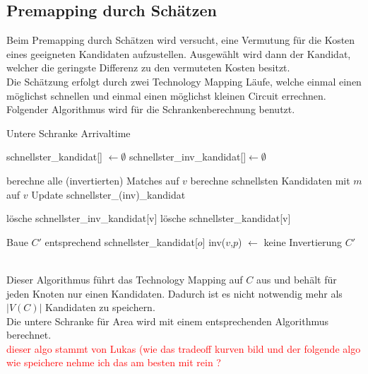 \documentclass[11pt, a4paper, german]{article}
\newcommand{\TM}{Technology  Mapping }
\begin{document}
\subsection{Premapping durch Schätzen}
\label{subsec:premapping_duch_schaetzen}
 Beim Premapping durch Schätzen wird versucht, eine Vermutung für die Kosten eines geeigneten Kandidaten aufzustellen. Ausgewählt wird dann der Kandidat, welcher die geringste Differenz zu den vermuteten Kosten besitzt.\\
Die Schätzung erfolgt durch zwei \TM Läufe, welche einmal einen möglichst schnellen und einmal einen möglichst kleinen Circuit errechnen. Folgender Algorithmus wird für die Schrankenberechnung benutzt.\\
 
\begin{algorithm}[H]
 \LinesNumbered
 \DontPrintSemicolon
 \caption{Untere Schranke Arrivaltime}

 schnellster\_kandidat[] $\gets \emptyset$\;
 schnellster\_inv\_kandidat[]$ \gets \emptyset$\;
 {
   berechne alle (invertierten) Matches auf $v$\;
   {
      berechne schnellsten Kandidaten mit $m$ auf $v$\;
      Update schnellster\_(inv)\_kandidat\;
   }
   {
      
      {
	l\"osche schnellster\_inv\_kandidat[v]\;
      }
      \Else
      {
	l\"osche schnellster\_kandidat[v]\;
      }
   }
 }
 Baue $C'$ entsprechend schnellster\_kandidat[$o$]\;
 {
    {
      {
	inv($v$,$p$) $\gets$ keine Invertierung\;
      }
    }
 }
 \Return $C'$\;
\end{algorithm}\ \\

 Dieser Algorithmus führt das \TM auf $C$ aus und behält für jeden Knoten nur einen Kandidaten. Dadurch ist es nicht notwendig mehr als $|V(C)|$ Kandidaten zu speichern. \\
 Die untere Schranke für Area wird mit einem entsprechenden Algorithmus berechnet. \\
 \textcolor{red}{dieser algo stammt von Lukas (wie das tradeoff kurven bild und der folgende algo wie speichere nehme ich das am besten mit rein ?}\\
\end{document}
